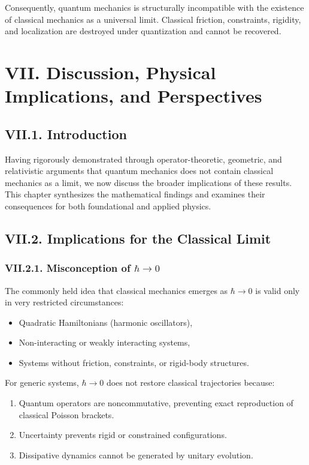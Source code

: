 \documentclass[12pt,oneside]{book}
\theoremstyle{plain}
\theoremstyle{definition}
\begin{document}
Consequently, quantum mechanics is structurally incompatible with the existence of classical mechanics as a universal limit. Classical friction, constraints, rigidity, and localization are destroyed under quantization and cannot be recovered.


\chapter{VII. Discussion, Physical Implications, and Perspectives}

\section{VII.1. Introduction}

Having rigorously demonstrated through operator-theoretic, geometric, and relativistic arguments that quantum mechanics does not contain classical mechanics as a limit, we now discuss the broader implications of these results. This chapter synthesizes the mathematical findings and examines their consequences for both foundational and applied physics.

\section{VII.2. Implications for the Classical Limit}

\subsection*{VII.2.1. Misconception of $\hbar \to 0$}

The commonly held idea that classical mechanics emerges as $\hbar \to 0$ is valid only in very restricted circumstances:

\begin{itemize}
    \item Quadratic Hamiltonians (harmonic oscillators),
    \item Non-interacting or weakly interacting systems,
    \item Systems without friction, constraints, or rigid-body structures.
\end{itemize}

For generic systems, $\hbar \to 0$ does not restore classical trajectories because:

\begin{enumerate}
    \item Quantum operators are noncommutative, preventing exact reproduction of classical Poisson brackets.
    \item Uncertainty prevents rigid or constrained configurations.
    \item Dissipative dynamics cannot be generated by unitary evolution.
\end{enumerate}
\end{document}
